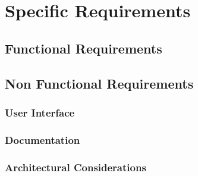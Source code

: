 \chapter{Specific Requirements}

\section{Functional Requirements}

\section{Non Functional Requirements}

\subsection{User Interface}

\subsection{Documentation}

\subsection{Architectural Considerations}